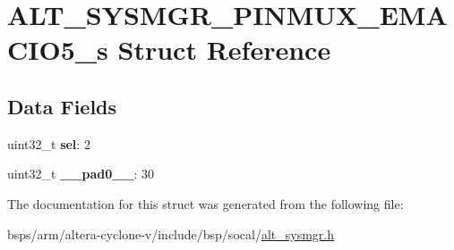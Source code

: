 \hypertarget{structALT__SYSMGR__PINMUX__EMACIO5__s}{}\section{A\+L\+T\+\_\+\+S\+Y\+S\+M\+G\+R\+\_\+\+P\+I\+N\+M\+U\+X\+\_\+\+E\+M\+A\+C\+I\+O5\+\_\+s Struct Reference}
\label{structALT__SYSMGR__PINMUX__EMACIO5__s}
\subsection*{Data Fields}
\begin{DoxyCompactItemize}
\item 
\mbox{\label{structALT__SYSMGR__PINMUX__EMACIO5__s_a9633c26734f8e953664f8edee164757f}} 
uint32\+\_\+t {\bfseries sel}\+: 2
\item 
\mbox{\label{structALT__SYSMGR__PINMUX__EMACIO5__s_a17611a837b4cf69394c2d8df802bd285}} 
uint32\+\_\+t {\bfseries \+\_\+\+\_\+pad0\+\_\+\+\_\+}\+: 30
\end{DoxyCompactItemize}


The documentation for this struct was generated from the following file\+:\begin{DoxyCompactItemize}
\item 
bsps/arm/altera-\/cyclone-\/v/include/bsp/socal/\mbox{\hyperlink{alt__sysmgr_8h}{alt\+\_\+sysmgr.\+h}}\end{DoxyCompactItemize}
